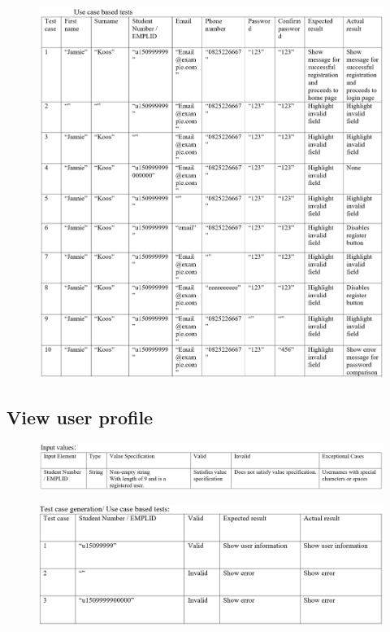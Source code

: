\documentclass[english]{article}
\begin{document}
\begin{figure}[H]
\hspace*{-2.5cm} 
\includegraphics[width=180mm]{7.png}
\end{figure}

\subsection{View user profile}
\begin{figure}[ht!]
\hspace*{-2.5cm} 
\includegraphics[width=180mm]{8.png}
\end{figure}

\begin{figure}[ht!]
\hspace*{-2.5cm} 
\includegraphics[width=180mm]{ViewTestCase.png}
\end{figure}
\end{document}
